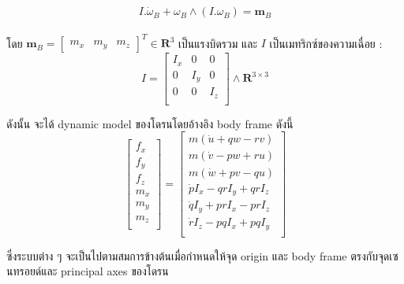 \begin{equation}
	{
		I.\dot{\omega}_B+\omega_B\wedge(I.\omega_B)=\mathbf{m}_B
	}
	\label{equ:total force}
\end{equation}
\\
โดย $\mathbf{m}_B=\begin{bmatrix}m_x & m_y & m_z\end{bmatrix}^T \in \mathbf{R}^3$ เป็นแรงบิดรวม และ $I$ เป็นเมทริกซ์ของความเฉื่อย :
\begin{equation}
	{
		I = \begin{bmatrix}I_x & 0 & 0 \\
		0   & I_y & 0 \\
		0   & 0 & I_z \\
		\end{bmatrix} \wedge \mathbf{R}^{3\times3}
	}
	\label{equ:inertia matrix}
\end{equation}

ดังนั้น จะได้ dynamic model ของโดรนโดยอ้างอิง body frame ดังนี้
\begin{equation}
	{
		\begin{bmatrix}	f_x \\
			f_y \\
			f_z \\
			m_x \\
			m_y \\
			m_z \\   
		\end{bmatrix} = 
		\begin{bmatrix}	m(\dot{u}+qw-rv) \\
			m(\dot{v}-pw+ru)       \\
			m(\dot{w}+pv-qu)       \\
			\dot{p}I_x-qrI_y+qrI_z \\
			\dot{q}I_y+prI_x-prI_z \\
			\dot{r}I_z-pqI_x+pqI_y \\   
		\end{bmatrix}
	}
	\label{equ:dynamic model}
\end{equation}

ซึ่งระบบต่าง ๆ จะเป็นไปตามสมการข้างต้นเมื่อกำหนดให้จุด origin และ body frame ตรงกับจุดเซนทรอยด์และ principal axes ของโดรน
